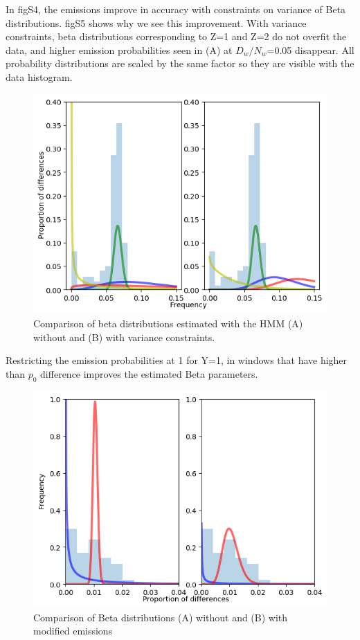 \documentclass[12pt, letterpaper]{article}
\begin{document}
In figS4, the emissions improve in accuracy with constraints on variance of Beta distributions. figS5 shows why we see this improvement. With variance constraints, beta distributions corresponding to Z=1 and Z=2 do not overfit the data, and higher emission probabilities seen in (A) at $D_w/N_w$=0.05 disappear. All probability distributions are scaled by the same factor so they are visible with the data histogram.
\begin{figure}[h]
    \centering
    \includegraphics[width=18cm]{supplementary_info/plots/contam0_inbred1_run57_coverage0.2_asc0_inputMode_hapProbs_fil0_pair0_15_relid_betaplot.png}
    \caption{Comparison of beta distributions estimated with the HMM (A) without and (B) with variance constraints.}
    \label{figS3}
\end{figure}

Restricting the emission probabilities at 1 for Y=1, in windows that have higher than $p_0$ difference improves the estimated Beta parameters. 
\begin{figure}[h]
    \centering
    \includegraphics[width=18cm]{supplementary_info/plots/contam0_inbred1_run57_coverage0.2_asc0_inputMode_hapProbs_fil0_ind0_foreced_roh.png}
    \caption{Comparison of Beta distributions (A) without and (B) with modified emissions}
    \label{figS3}
\end{figure}
\end{document}
